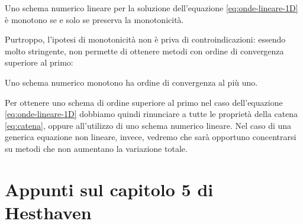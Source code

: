 \begin{teor}
Uno schema numerico lineare per la soluzione dell'equazione \eqref{eq:onde-lineare-1D}
è monotono se e solo se preserva la monotonicità.
\end{teor}

Purtroppo, l'ipotesi di monotonicità non è priva di controindicazioni:
essendo molto stringente, non permette di ottenere metodi con ordine
di convergenza superiore al primo:

\begin{teor}
Uno schema numerico monotono ha ordine di convergenza al più uno.
\end{teor}

Per ottenere uno schema di ordine superiore al primo
nel caso dell'equazione \eqref{eq:onde-lineare-1D} dobbiamo quindi
rinunciare a tutte le proprietà della catena \eqref{eq:catena}, oppure
all'utilizzo di uno schema numerico lineare.
Nel caso di una generica equazione non lineare, invece, vedremo
che sarà opportuno concentrarsi su metodi che non aumentano
la variazione totale.

\section{Appunti sul capitolo 5 di Hesthaven}

